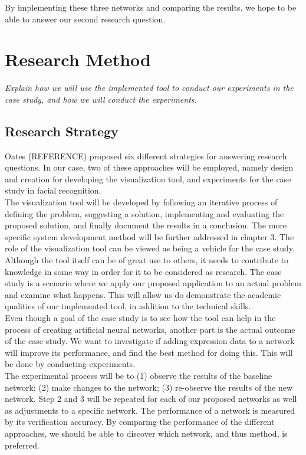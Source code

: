 \noindent By implementing these three networks and comparing the results, we hope to be able to answer our second research question.

\section{Research Method}

\textit{Explain how we will use the implemented tool to conduct our experiments in the case study, and how we will conduct the experiments.}

\subsection{Research Strategy}

\noindent Oates (REFERENCE) proposed six different strategies for answering research questions. In our case, two of these approaches will be employed, namely design and creation for developing the visualization tool, and experiments for the case study in facial recognition. \\

\noindent The visualization tool will be developed by following an iterative process of defining the problem, suggesting a solution, implementing and evaluating the proposed solution, and finally document the results in a conclusion. The more specific system development method will be further addressed in chapter 3. The role of the visualization tool can be viewed as being a vehicle for the case study. Although the tool itself can be of great use to others, it needs to contribute to knowledge in some way in order for it to be considered as research. The case study is a scenario where we apply our proposed application to an actual problem and examine what happens. This will allow us do demonstrate the academic qualities of our implemented tool, in addition to the technical skills. \\

\noindent Even though a goal of the case study is to see how the tool can help in the process of creating artificial neural networks, another part is the actual outcome of the case study. We want to investigate if adding expression data to a network will improve its performance, and find the best method for doing this. This will be done by conducting experiments. \\

\noindent The experimental process will be to (1) observe the results of the baseline network; (2) make changes to the network; (3) re-observe the results of the new network. Step 2 and 3 will be repeated for each of our proposed networks as well as adjustments to a specific network. The performance of a network is measured by its verification accuracy. By comparing the performance of the different approaches, we should be able to discover which network, and thus method, is preferred. \\

